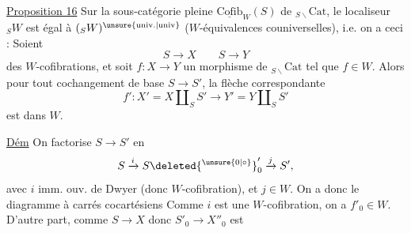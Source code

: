 \uline{Proposition 16} Sur  la sous-catégorie pleine $\underline{\mathrm{Cofib}}_W(S)$ de $ {}_{S\backslash}\mathrm{Cat}$, le localiseur $ {}_S W$ est égal à $({}_S W)^{\unsure{\mathrm{univ.}|\mathrm{univ}}}$ ($W$-équivalences couniverselles), i.e. on a ceci : Soient
\[
S\longrightarrow X\qquad S\longrightarrow Y
\]
des $W$-cofibrations, et soit $f:X\longrightarrow Y$ un morphisme de $ {}_{S\backslash}\mathrm{Cat}$ tel que $f\in W$. Alors pour tout cochangement de base $S\longrightarrow S'$, la flèche correspondante
\[
f':X'=X\amalg_S S'\longrightarrow Y'=Y\amalg_S S'
\]
est dans $W$.

\uline{Dém} On factorise  $S\longrightarrow S'$ en
\[
S\xrightarrow{i}S\deleted{^{\unsure{0|\circ}}}'_0\xrightarrow{j}S',
\]
avec $i$ imm. ouv. de Dwyer (donc $W$-cofibration), et $j\in W$. On a donc le diagramme à carrés cocartésiens
Comme $i$ est une $W$-cofibration,  on a $f'_0\in W$. D’autre part, comme $S\longrightarrow X$ donc $S'_0\longrightarrow X''_0$ est
